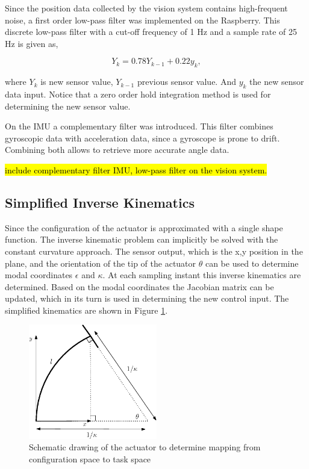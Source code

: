 Since the position data collected by the vision system contains high-frequent noise, a first order low-pass filter was implemented on the Raspberry. This discrete low-pass filter with a cut-off frequency of 1 Hz and a sample rate of 25 Hz is given as,

\begin{equation}
    Y_k = 0.78Y_{k-1} + 0.22y_k,
\end{equation}

where $Y_k$ is new sensor value, $Y_{k-1}$ previous sensor value. And $y_k$ the new sensor data input. Notice that a zero order hold integration method is used for determining the new sensor value.

On the IMU a complementary filter was introduced. This filter combines gyroscopic data with acceleration data, since a gyroscope is prone to drift. Combining both allows to retrieve more accurate angle data. 


\hl{include complementary filter IMU, low-pass filter on the vision system.}

\subsection{Simplified Inverse Kinematics}

Since the configuration of the actuator is approximated with a single shape function. The inverse kinematic problem can implicitly be solved with the constant curvature approach. The sensor output, which is the x,y position in the plane, and the orientation of the tip of the actuator $\theta$ can be used to determine modal coordinates $\epsilon$ and $\kappa$. At each sampling instant this inverse kinematics are determined. Based on the modal coordinates the Jacobian matrix can be updated, which in its turn is used in determining the new control input. The simplified kinematics are shown in Figure \ref{fig:simpkin}.

\begin{figure}[H]
    \centering
    \includegraphics[width = 0.5\textwidth]{Figures/Chapter5/fbdkinematics.eps}
    \caption{Schematic drawing of the actuator to determine mapping from configuration space to task space}
    \label{fig:simpkin}
\end{figure}

